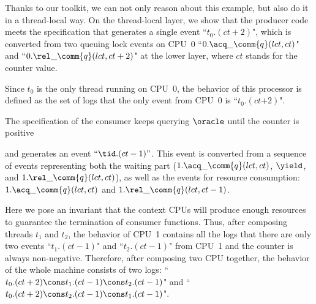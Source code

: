{{Thanks to our toolkit, we can not only reason about this example,
but also do it in a thread-local way.
On the thread-local layer, we show that the producer 
code meets the specification that generates a single
event ``$t_0.(ct +2)$", which is converted
from 
two queuing lock events on CPU~0 ``$0.\acq\_\comm{q}(lct, ct)$" and ``$0.\rel\_\comm{q}(lct, ct+2)$" at the lower layer, where $ct$ stands for
the counter value.
%
%
Since $t_0$ is the only thread  running on CPU~0,
the behavior of this processor is defined as the set of
logs that the only event  from CPU~0  is ``$t_0.(ct\text{+2})$".

The specification of the consumer keeps 
querying $\oracle$ until the counter is positive
and generates an
event $``\tid.(ct-1)"$.
This event is converted from
a sequence of events representing both the waiting part
($1.\acq\_\comm{q}(lct, ct)$, $\yield$, and $1.\rel\_\comm{q}(lct, ct)$),
as well as the events for resource consumption:
$1.\acq\_\comm{q}(lct, ct)$ and $1.\rel\_\comm{q}(lct, ct - 1)$.
%
Here we pose an invariant that the context CPUs will produce enough resources
to guarantee the termination of consumer functions.
Thus, after composing threads $t_1$ and $t_2$,
the behavior of CPU~1 contains all the logs
that there are only two events ``$t_1.(ct -1)$"
and ``$t_2.(ct -1)$" from CPU~1 and the counter is always non-negative.
Therefore, after composing two CPU together,
the behavior of the whole machine
consists of two logs: ``$t_0.(ct +2)\cons t_1.(ct -1) \cons t_2.(ct -1)$" and ``$t_0.(ct +2)\cons t_2.(ct -1) \cons t_1.(ct-1)$".

}}
